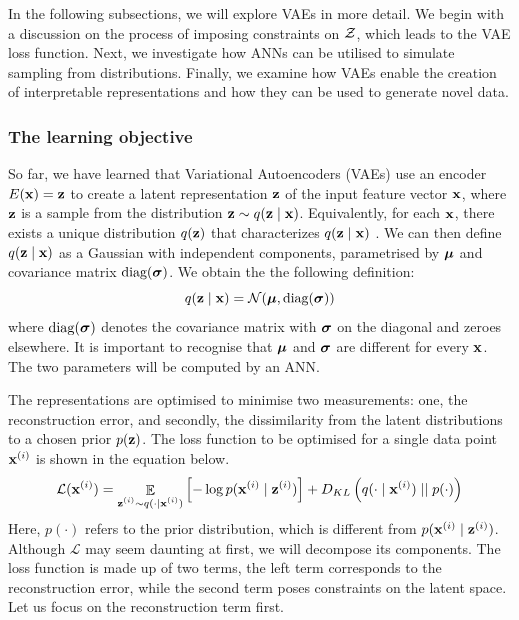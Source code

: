 In the following subsections, we will explore VAEs in more detail. We begin with a discussion on the process of imposing constraints on $\mathcal{Z}$, which leads to the VAE loss function. Next, we investigate how ANNs can be utilised to simulate sampling from distributions. Finally, we examine how VAEs enable the creation of interpretable representations and how they can be used to generate novel data.




\subsubsection{The learning objective}	

	So far, we have learned that Variational Autoencoders (VAEs) use an encoder $E(\mathbf{x}) = \mathbf{z}$ to create a latent representation $\mathbf{z}$ of the input feature vector $\mathbf{x}$, where $\mathbf{z}$ is a sample from the distribution $\mathbf{z} \sim q (\mathbf{z} \mid \mathbf{x})$. Equivalently, for each $\mathbf{x}$, there exists a unique distribution $q(\mathbf{z})$ that characterizes $q (\mathbf{z} \mid \mathbf{x})$ \citep{volodymyrkuleshovVariationalAutoencoder2023}. We can then define $q (\mathbf{z} \mid \mathbf{x})$ as a Gaussian with independent components, parametrised by $\bm{\mu}$ and covariance matrix $\text{diag}(\bm{\sigma})$. We obtain the the following definition:
	\begin{equation}
		q (\mathbf{z} \mid \mathbf{x}) = \mathcal{N}(\bm{\mu} , \text{diag}(\bm{\sigma})) \label{eq:definition_q}
	\end{equation}
	where $\text{diag}(\bm{\sigma})$ denotes the covariance matrix with $\bm{\sigma}$ on the diagonal and zeroes elsewhere. It is important to recognise that $\bm{\mu}$ and $\bm{\sigma}$ are different for every $\mathbf{x}$. The two parameters will be computed by an ANN.


	The representations are optimised to minimise two measurements: one, the reconstruction error, and secondly, the dissimilarity from the latent distributions to a chosen prior $p(\mathbf{z})$. %
	The loss function to be optimised for a single data point $\mathbf{x}^{(i)}$ is shown in the equation below.
	\begin{equation}
		\mathcal{L} (\mathbf{x}^{(i)}) = \mathop{\mathbb{E}}_{\substack{\mathbf{z}^{(i)} \sim q (\cdot \mid \mathbf{x}^{(i)})}} \left[ -\log p (\mathbf{x}^{(i)} \mid \mathbf{z}^{(i)}) \right] + D_{KL} \left(  q (\cdot \mid \mathbf{x}^{(i)})  \mid \mid  p(\cdot)  \right) \label{eq:elbo_explicit_intial}
	\end{equation} %
	Here, $p(\cdot)$ refers to the prior distribution, which is different from $p (\mathbf{x}^{(i)} \mid \mathbf{z}^{(i)})$.
	Although $\mathcal{L}$ may seem daunting at first, we will decompose its components. The loss function is made up of two terms, the left term corresponds to the reconstruction error, while the second term poses constraints on the latent space. Let us focus on the reconstruction term first.
	
